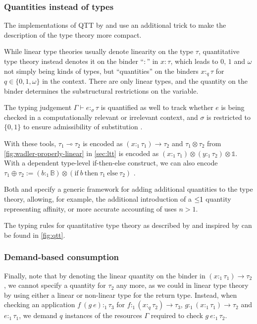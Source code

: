 \subsubsection{Quantities instead of types}
The implementations of QTT by \cite{lindley_i_2016} and \cite{atkey_syntax_2018} use an additional trick to make the description of the type theory more compact. 

While linear type theories usually denote linearity on the type $\tau$, quantitative type theory instead denotes it on the binder ``$:$'' in $x : \tau$, which leads to $0$, $1$ and $\omega$ not simply being kinds of types, but ``quantities'' on the binders $x :_q \tau$ for $q \in \{0, 1, \omega\}$ in the context. There are only linear types, and the quantity on the binder determines the substructural restrictions on the variable. 

The typing judgement $\Gamma \vdash e :_\sigma \tau$ is quantified as well to track whether $e$ is being checked in a computationally relevant or irrelevant context, and $\sigma$ is restricted to $\{0, 1\}$ to ensure admissibility of substitution \citep{atkey_syntax_2018}. 

With these tools, $\tau_1 \multimap \tau_2$ is encoded as $(x :_1 \tau_1) \to \tau_2$ and $\tau_1 \otimes \tau_2$ from \cref{fig:wadler-properly-linear} in \cref{sec:ltt} is encoded as $(x :_1 \tau_1) \otimes (y :_1 \tau_2) \otimes \mathbb{1}$. With a dependent type-level if-then-else construct, we can also encode $\tau_1 \oplus \tau_2 := (b :_1 \mathbb{B}) \otimes (\mathrm{if}\ b\ \mathrm{then}\ \tau_1\ \mathrm{else}\ \tau_2)$ \citep{grenrus_dependent_2020}.

Both \cite{lindley_i_2016} and \cite{atkey_syntax_2018} specify a generic framework for adding additional quantities to the type theory, allowing, for example, the additional introduction of a $\leq\hspace{-0.3em}1$ quantity representing affinity, or more accurate accounting of uses $n > 1$.

The typing rules for quantitative type theory as described by \cite{svoboda_additive_2021} and inspired by \cite{atkey_syntax_2018} can be found in \cref{fig:qtt}.

\subsubsection{Demand-based consumption}
Finally, note that by denoting the linear quantity on the binder in $(x :_1 \tau_1) \to \tau_2$, we cannot specify a quantity for $\tau_2$ any more, as we could in linear type theory by using either a linear or non-linear type for the return type. Instead, when checking an application $f\ (g\ e) :_1 \tau_3$ for $f :_1 (x :_q \tau_2) \to \tau_3$, $g :_1 (x :_1 \tau_1) \to \tau_2$ and $e :_1 \tau_1$, we demand $q$ instances of the resources $\Gamma$ required to check $g\ e :_1 \tau_2$. 

